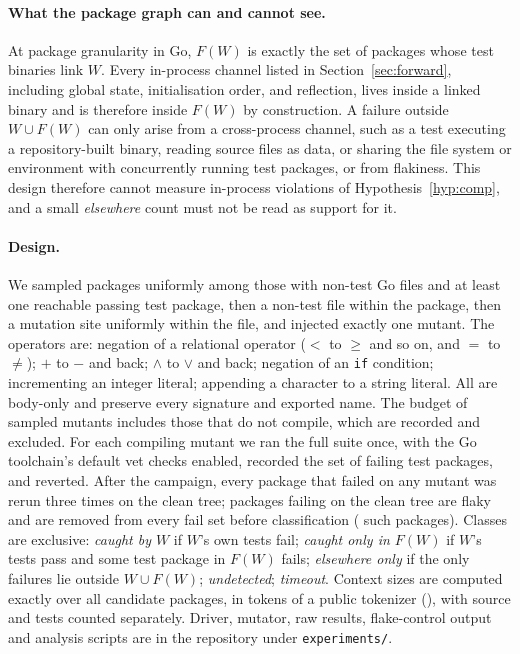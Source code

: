 \documentclass[10pt]{article}
\theoremstyle{definition}
\theoremstyle{plain}
\theoremstyle{remark}
\begin{document}
\paragraph{What the package graph can and cannot see.} At package granularity in Go, $F(W)$ is exactly the set of packages whose test binaries link $W$. Every in-process channel listed in Section~\ref{sec:forward}, including global state, initialisation order, and reflection, lives inside a linked binary and is therefore inside $F(W)$ by construction. A failure outside $W \cup F(W)$ can only arise from a cross-process channel, such as a test executing a repository-built binary, reading source files as data, or sharing the file system or environment with concurrently running test packages, or from flakiness. This design therefore cannot measure in-process violations of Hypothesis~\ref{hyp:comp}, and a small \emph{elsewhere} count must not be read as support for it.

\paragraph{Design.} We sampled packages uniformly among those with non-test Go files and at least one reachable passing test package, then a non-test file within the package, then a mutation site uniformly within the file, and injected exactly one mutant. The operators are: negation of a relational operator ($<$ to $\geq$ and so on, and $=$ to $\neq$); $+$ to $-$ and back; $\wedge$ to $\vee$ and back; negation of an \texttt{if} condition; incrementing an integer literal; appending a character to a string literal. All are body-only and preserve every signature and exported name. The budget of \cliNMut{} sampled mutants includes those that do not compile, which are recorded and excluded. For each compiling mutant we ran the full suite once, with the Go toolchain's default vet checks enabled, recorded the set of failing test packages, and reverted. After the campaign, every package that failed on any mutant was rerun three times on the clean tree; packages failing on the clean tree are flaky and are removed from every fail set before classification (\cliNFlaky{} such packages). Classes are exclusive: \emph{caught by $W$} if $W$'s own tests fail; \emph{caught only in $F(W)$} if $W$'s tests pass and some test package in $F(W)$ fails; \emph{elsewhere only} if the only failures lie outside $W \cup F(W)$; \emph{undetected}; \emph{timeout}. Context sizes are computed exactly over all \cliNCand{} candidate packages, in tokens of a public tokenizer (\cliTokenizer), with source and tests counted separately. Driver, mutator, raw results, flake-control output and analysis scripts are in the repository under \texttt{experiments/}.
\end{document}
